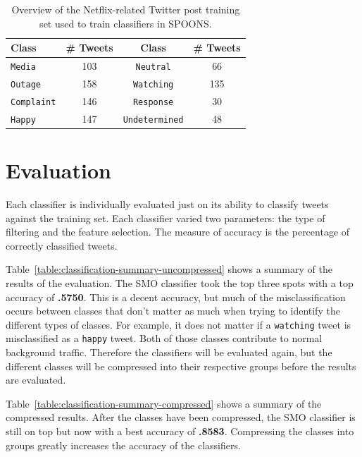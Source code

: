 \documentclass[12pt]{ucthesis}
\begin{document}
\begin{table}
   \begin{center}
      \begin{tabular}{|l|c|c|c|}
         \hline
         Class  & \# Tweets & Class & \# Tweets
         \tabularnewline\hline
         \texttt{Media} & 103 & \texttt{Neutral} & 66
         \tabularnewline\hline
         \texttt{Outage} & 158  & \texttt{Watching} &  135
         \tabularnewline\hline
         \texttt{Complaint}  & 146 &  \texttt{Response} &  30
         \tabularnewline\hline
         \texttt{Happy}  & 147  & \texttt{Undetermined}  & 48
         \tabularnewline\hline
      \end{tabular}
      \caption[Netflix-related Twitter Traffic]{Overview of the Netflix-related Twitter post training set used to train classifiers in SPOONS.}
      \label{table:classCounts}
   \end{center}
\end{table}

\section{Evaluation}
\label{class-evaluation}
Each classifier is individually evaluated just on its ability to classify tweets against the training set.
Each classifier varied two parameters: the type of filtering and the feature selection.
The measure of accuracy is the percentage of correctly classified tweets.

Table~\ref{table:classification-summary-uncompressed} shows a summary of the results of the evaluation.
The SMO classifier took the top three spots with a top accuracy of \textbf{.5750}.
This is a decent accuracy, but much of the misclassification occurs between classes that don't matter
as much when trying to identify the different types of classes. For example, it does not matter if
a \texttt{watching} tweet is misclassified as a \texttt{happy} tweet. Both of those classes contribute to
normal background traffic. Therefore the classifiers will be evaluated again, but the different classes
will be compressed into their respective groups before the results are evaluated.



Table~\ref{table:classification-summary-compressed} shows a summary of the compressed results.
After the classes have been compressed, the SMO classifier is still on top but now with a best accuracy
of \textbf{.8583}. Compressing the classes into groups greatly increases the accuracy of the classifiers.
\end{document}

